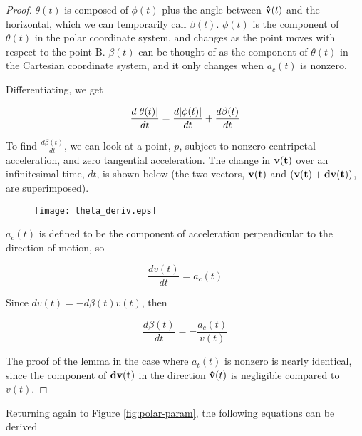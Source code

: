 \begin{proof}

$\theta(t)$ is composed of $\phi(t)$ plus the angle between $\mathbf{\hat{v}}(t)$ and the horizontal, which we can temporarily call $\beta(t)$. $\phi(t)$ is the component of $\theta(t)$ in the polar coordinate system, and changes as the point moves with respect to the point B. $\beta(t)$ can be thought of as the component of $\theta(t)$ in the Cartesian coordinate system, and it only changes when $a_c(t)$ is nonzero. 

Differentiating, we get

\[
\frac{d\abs{\theta(t)}}{dt} = \frac{d\abs{\phi(t)}}{dt} + \frac{d\beta(t)}{dt}
\]

To find $\frac{d\beta(t)}{dt}$, we can look at a point, $p$, subject to nonzero centripetal acceleration, and zero tangential acceleration. The change in $\mathbf{v(t)}$ over an infinitesimal time, $dt$, is shown below (the two vectors, $\mathbf{v(t)}$ and $\paren{\bvec{v(t)}+\bvec{dv(t)}}$, are superimposed). 

\begin{figure}[H]
    \begin{center}
      \texttt{[image: theta\_deriv.eps]}
    \end{center}
  \vspace{-.2in} %
  \caption{}
\end{figure}

$a_c(t)$ is defined to be the component of acceleration perpendicular to the direction of motion, so

\[
\frac{dv(t)}{dt} = a_c(t)
\]

Since $dv(t) = -d\beta(t) v(t)$, then

\[
\frac{d\beta(t)}{dt} = -\frac{a_c(t)}{v(t)}
\]

The proof of the lemma in the case where $a_t(t)$ is nonzero is nearly identical, since the component of $\mathbf{dv(t)}$ in the direction $\mathbf{\hat{v}}(t)$ is negligible compared to $v(t)$.

\end{proof}

Returning again to Figure \ref{fig:polar-param}, the following equations can be derived

